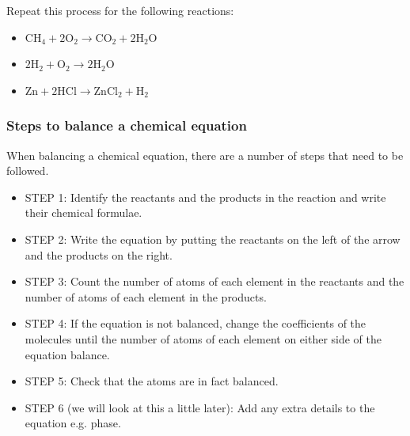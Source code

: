     
\par 
\label{m38726*id570943}Repeat this process for the following reactions:
\label{m38726*id08342}\begin{itemize}[noitemsep]
            \item 
\begin{math}{\mathrm{CH}}_{4}+2{\mathrm{O}}_{2}\to {\mathrm{CO}}_{2}+2{\mathrm{H}}_{2}\mathrm{O}\end{math}
\item 
\begin{math}2{\mathrm{H}}_{2}+{\mathrm{O}}_{2}\to 2{\mathrm{H}}_{2}\mathrm{O}\end{math}
\item 
\begin{math}\mathrm{Zn}+2\mathrm{HCl}\to {\mathrm{ZnCl}}_{2}+{\mathrm{H}}_{2}\end{math}
\end{itemize}
        
\par \label{m38726*uid10}
            \subsubsection{ Steps to balance a chemical equation}
            \nopagebreak
            
        
        \label{m38726*id63708}When balancing a chemical equation, there are a number of steps that need to be followed.\par 
        \label{m38726*id63712}\begin{itemize}[noitemsep]
            \label{m38726*uid11}\item STEP 1: Identify the reactants and the products in the reaction and write their chemical formulae.
\label{m38726*uid12}\item STEP 2: Write the equation by putting the reactants on the left of the arrow and the products on the right.
\label{m38726*uid13}\item STEP 3: Count the number of atoms of each element in the reactants and the number of atoms of each element in the products.
\label{m38726*uid14}\item STEP 4: If the equation is not balanced, change the coefficients of the molecules until the number of atoms of each element on either side of the equation balance.
\label{m38726*uid15}\item STEP 5: Check that the atoms are in fact balanced.
\label{m38726*uid16}\item STEP 6 (we will look at this a little later): Add any extra details to the equation e.g. phase.
\end{itemize}
        
